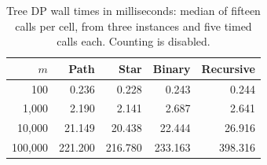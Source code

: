 \begin{table}[H]
\caption{Tree DP wall times in milliseconds: median of fifteen calls per cell, from three instances and five timed calls each. Counting is disabled.}\label{tab:timing}
\centering\begin{tabular}{r r r r r}
\hline $m$ & Path & Star & Binary & Recursive\\\hline
100 & 0.236 & 0.228 & 0.243 & 0.244\\
1,000 & 2.190 & 2.141 & 2.687 & 2.641\\
10,000 & 21.149 & 20.438 & 22.444 & 26.916\\
100,000 & 221.200 & 216.780 & 233.163 & 398.316\\
\hline\end{tabular}\end{table}
